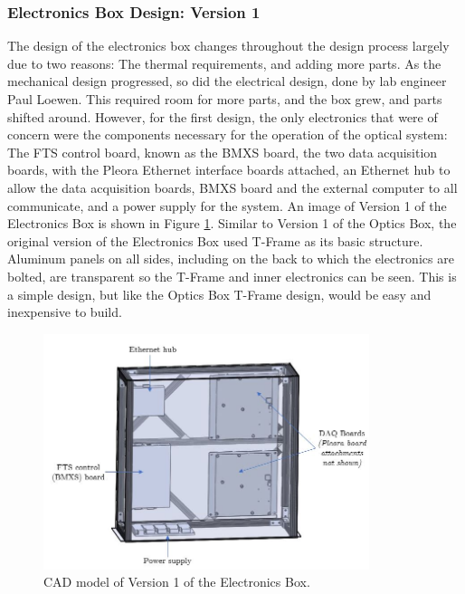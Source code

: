 \subsubsection{Electronics Box Design: Version 1}
The design of the electronics box changes throughout the design process largely due to two reasons: The thermal requirements, and adding more parts. As the mechanical design progressed, so did the electrical design, done by lab engineer Paul Loewen. This required room for more parts, and the box grew, and parts shifted around. However, for the first design, the only electronics that were of concern were the components necessary for the operation of the optical system: The FTS control board, known as the BMXS board, the two data acquisition boards, with the Pleora Ethernet interface boards attached, an Ethernet hub to allow the data acquisition boards, BMXS board and the external computer to all communicate, and a power supply for the system. An image of Version 1 of the Electronics Box is shown in Figure \ref{fig:Ebox_V1}. Similar to Version 1 of the Optics Box, the original version of the Electronics Box used T-Frame as its basic structure. Aluminum panels on all sides, including on the back to which the electronics are bolted, are transparent so the T-Frame and inner electronics can be seen. This is a simple design, but like the Optics Box T-Frame design, would be easy and inexpensive to build.

\begin{figure}
    \centering
    \includegraphics[width=0.85\textwidth]{chap3_images/LIFE_V1_images/Ebox_V1_labelled.JPG}
    \caption{CAD model of Version 1 of the Electronics Box.}
    \label{fig:Ebox_V1}
\end{figure}

